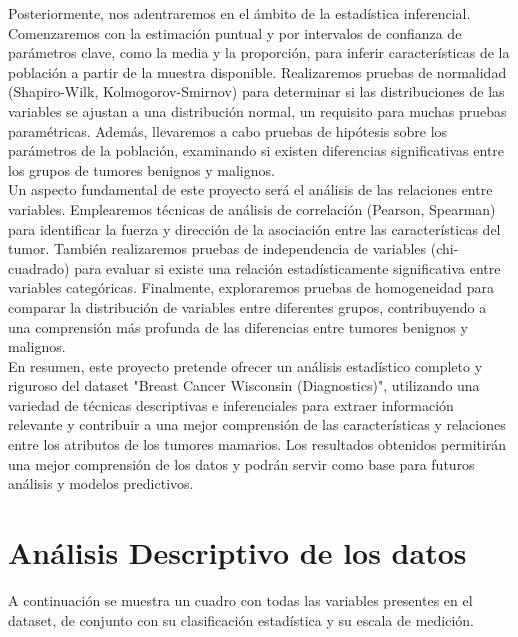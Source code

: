 \documentclass[a4paper, 12pt]{article}
\begin{document}
Posteriormente, nos adentraremos en el ámbito de la estadística inferencial. Comenzaremos con la estimación puntual y por intervalos de confianza de parámetros clave, como la media y la proporción, para inferir características de la población a partir de la muestra disponible. Realizaremos pruebas de normalidad (Shapiro-Wilk, Kolmogorov-Smirnov) para determinar si las distribuciones de las variables se ajustan a una distribución normal, un requisito para muchas pruebas paramétricas. Además, llevaremos a cabo pruebas de hipótesis sobre los parámetros de la población, examinando si existen diferencias significativas entre los grupos de tumores benignos y malignos.\\

Un aspecto fundamental de este proyecto será el análisis de las relaciones entre variables. Emplearemos técnicas de análisis de correlación (Pearson, Spearman) para identificar la fuerza y dirección de la asociación entre las características del tumor. También realizaremos pruebas de independencia de variables (chi-cuadrado) para evaluar si existe una relación estadísticamente significativa entre variables categóricas. Finalmente, exploraremos pruebas de homogeneidad para comparar la distribución de variables entre diferentes grupos, contribuyendo a una comprensión más profunda de las diferencias entre tumores benignos y malignos.\\

En resumen, este proyecto pretende ofrecer un análisis estadístico completo y riguroso del dataset "Breast Cancer Wisconsin (Diagnostics)", utilizando una variedad de técnicas descriptivas e inferenciales para extraer información relevante y contribuir a una mejor comprensión de las características y relaciones entre los atributos de los tumores mamarios. Los resultados obtenidos permitirán una mejor comprensión de los datos y podrán servir como base para futuros análisis y modelos predictivos.\\

\newpage

\section{Análisis Descriptivo de los datos}

A continuación se muestra un cuadro con todas las variables presentes en el dataset, de conjunto con su clasificación estadística y su escala de medición.
\end{document}
